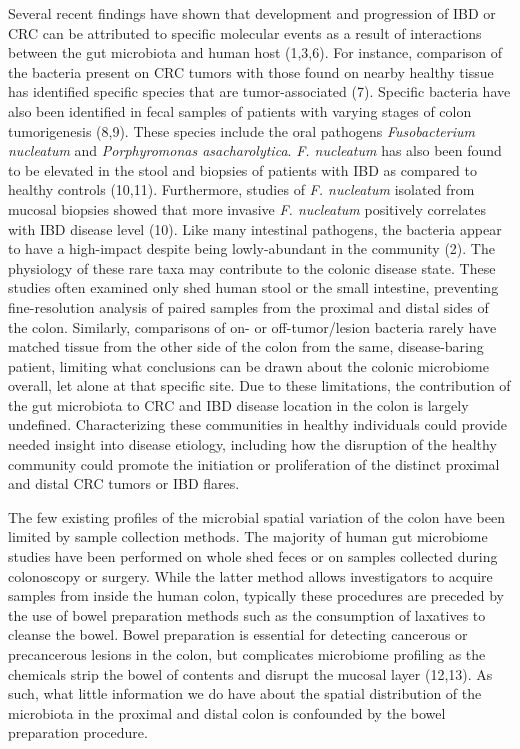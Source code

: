 \documentclass[12pt,]{article}
\begin{document}
Several recent findings have shown that development and progression of
IBD or CRC can be attributed to specific molecular events as a result of
interactions between the gut microbiota and human host (1,3,6). For
instance, comparison of the bacteria present on CRC tumors with those
found on nearby healthy tissue has identified specific species that are
tumor-associated (7). Specific bacteria have also been identified in
fecal samples of patients with varying stages of colon tumorigenesis
(8,9). These species include the oral pathogens \emph{Fusobacterium
nucleatum} and \emph{Porphyromonas asacharolytica}. \emph{F. nucleatum}
has also been found to be elevated in the stool and biopsies of patients
with IBD as compared to healthy controls (10,11). Furthermore, studies
of \emph{F. nucleatum} isolated from mucosal biopsies showed that more
invasive \emph{F. nucleatum} positively correlates with IBD disease
level (10). Like many intestinal pathogens, the bacteria appear to have
a high-impact despite being lowly-abundant in the community (2). The
physiology of these rare taxa may contribute to the colonic disease
state. These studies often examined only shed human stool or the small
intestine, preventing fine-resolution analysis of paired samples from
the proximal and distal sides of the colon. Similarly, comparisons of
on- or off-tumor/lesion bacteria rarely have matched tissue from the
other side of the colon from the same, disease-baring patient, limiting
what conclusions can be drawn about the colonic microbiome overall, let
alone at that specific site. Due to these limitations, the contribution
of the gut microbiota to CRC and IBD disease location in the colon is
largely undefined. Characterizing these communities in healthy
individuals could provide needed insight into disease etiology,
including how the disruption of the healthy community could promote the
initiation or proliferation of the distinct proximal and distal CRC
tumors or IBD flares.

The few existing profiles of the microbial spatial variation of the
colon have been limited by sample collection methods. The majority of
human gut microbiome studies have been performed on whole shed feces or
on samples collected during colonoscopy or surgery. While the latter
method allows investigators to acquire samples from inside the human
colon, typically these procedures are preceded by the use of bowel
preparation methods such as the consumption of laxatives to cleanse the
bowel. Bowel preparation is essential for detecting cancerous or
precancerous lesions in the colon, but complicates microbiome profiling
as the chemicals strip the bowel of contents and disrupt the mucosal
layer (12,13). As such, what little information we do have about the
spatial distribution of the microbiota in the proximal and distal colon
is confounded by the bowel preparation procedure.
\end{document}
